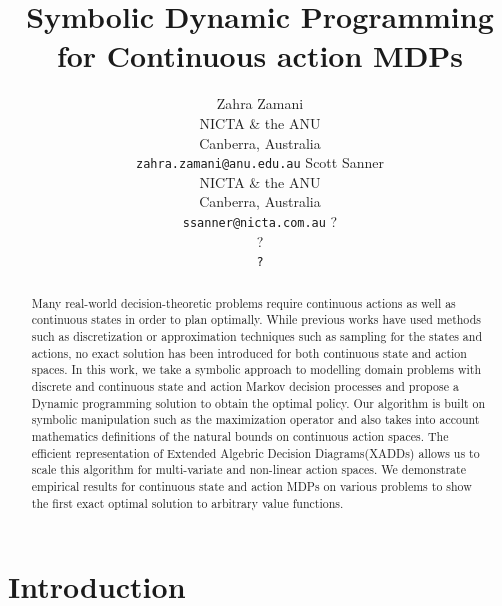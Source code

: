 \documentclass[letterpaper]{article}
\renewcommand{\-}{\text{-}}
\begin{document}
%
\title{Symbolic Dynamic Programming for Continuous action MDPs}

\author{Zahra Zamani\\
NICTA \& the ANU\\
Canberra, Australia\\
{\tt zahra.zamani@anu.edu.au}
\And
Scott Sanner\\
NICTA \& the ANU\\
Canberra, Australia\\
{\tt ssanner@nicta.com.au}
\And
?\\
?\\
{\tt ?}
}
\maketitle

\begin{abstract}
Many real-world decision-theoretic problems require continuous actions as well as continuous states in order to plan optimally. While previous works have used methods such as  discretization or approximation techniques such as sampling for the states and actions, no exact solution has been introduced for both continuous state and action spaces. In this work, we take a symbolic approach to modelling domain problems with discrete and continuous state and action Markov decision processes and propose a Dynamic programming solution to obtain the optimal policy. Our algorithm is built on symbolic manipulation such as the maximization operator and also takes into account mathematics definitions of the natural bounds on continuous action spaces. The efficient representation of Extended Algebric Decision Diagrams(XADDs) allows us to scale this algorithm for multi-variate and non-linear action spaces. We demonstrate empirical results for continuous state and action MDPs on various problems to show the first exact optimal solution to arbitrary value functions.
\end{abstract}


\section{Introduction}

\label{sec:intro}
\end{document}

